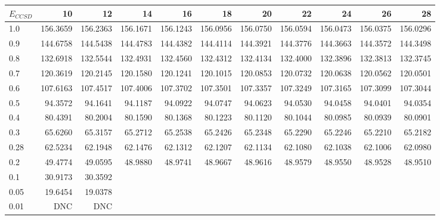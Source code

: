 \begin{landscape}
\begin{table}
\begin{center}
\begin{tabular}{l|rrrrrrrrrr}
\hline 
$E_{CCSD}$ & 10 & 12 & 14 & 16 & 18 & 20 & 22 & 24 & 26 & 28 \\
\hline \hline
1.0 & 156.3659 & 156.2363 & 156.1671 & 156.1243 & 156.0956 & 156.0750 & 156.0594 & 156.0473 & 156.0375 & 156.0296 \\ 
0.9 & 144.6758 & 144.5438 & 144.4783 & 144.4382 & 144.4114 & 144.3921 & 144.3776 & 144.3663 & 144.3572 & 144.3498 \\ 
0.8 & 132.6918 & 132.5544 & 132.4931 & 132.4560 & 132.4312 & 132.4134 & 132.4000 & 132.3896 & 132.3813 & 132.3745 \\ 
0.7 & 120.3619 & 120.2145 & 120.1580 & 120.1241 & 120.1015 & 120.0853 & 120.0732 & 120.0638 & 120.0562 & 120.0501 \\ 
0.6 & 107.6163 & 107.4517 & 107.4006 & 107.3702 & 107.3501 & 107.3357 & 107.3249 & 107.3165 & 107.3099 & 107.3044 \\ 
0.5 &  94.3572 &  94.1641 &  94.1187 &  94.0922 &  94.0747 &  94.0623 &  94.0530 &  94.0458 &  94.0401 &  94.0354 \\ 
0.4 &  80.4391 &  80.2004 &  80.1590 &  80.1368 &  80.1223 &  80.1120 &  80.1044 &  80.0985 &  80.0939 &  80.0901 \\ 
0.3 &  65.6260 &  65.3157 &  65.2712 &  65.2538 &  65.2426 &  65.2348 &  65.2290 &  65.2246 &  65.2210 &  65.2182 \\ 
0.28&  62.5234 &  62.1948 &  62.1476 &  62.1312 &  62.1207 &  62.1134 &  62.1080 &  62.1038 &  62.1006 &  62.0980 \\ 
0.2 &  49.4774 &  49.0595 &  48.9880 &  48.9741 &  48.9667 &  48.9616 &  48.9579 &  48.9550 &  48.9528 &  48.9510 \\ 
0.1 & 30.9173 & 30.3592 &   \\
0.05 & 19.6454 & 19.0378  \\ 
0.01 & DNC & DNC  \\ 
\hline \hline
\end{tabular}
\end{center}
\end{table}
\end{landscape}


